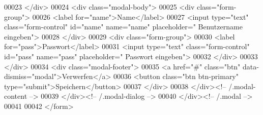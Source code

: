 \begin{DoxyCode}
00023                 </div>
00024                 <div \textcolor{keyword}{class}=\textcolor{stringliteral}{"modal-body"}>
00025                   <div \textcolor{keyword}{class}=\textcolor{stringliteral}{"form-group"}>
00026                             <label \textcolor{keywordflow}{for}=\textcolor{stringliteral}{"name"}>Name</label>
00027                             <input type=\textcolor{stringliteral}{"text"} \textcolor{keyword}{class}=\textcolor{stringliteral}{"form-control"} \textcolor{keywordtype}{id}=\textcolor{stringliteral}{"name"} name=\textcolor{stringliteral}{"name"} placeholder=\textcolor{stringliteral}{"
      Benutzername eingeben"}>
00028                           </div>
00029                           <div \textcolor{keyword}{class}=\textcolor{stringliteral}{"form-group"}>
00030                             <label \textcolor{keywordflow}{for}=\textcolor{stringliteral}{"pass"}>Passwort</label>
00031                             <input type=\textcolor{stringliteral}{"text"} \textcolor{keyword}{class}=\textcolor{stringliteral}{"form-control"} \textcolor{keywordtype}{id}=\textcolor{stringliteral}{"pass"} name=\textcolor{stringliteral}{"pass"} placeholder=\textcolor{stringliteral}{"
      Passwort eingeben"}>
00032                           </div>
00033                 </div>
00034                 <div \textcolor{keyword}{class}=\textcolor{stringliteral}{"modal-footer"}>
00035                   <a href=\textcolor{stringliteral}{"#"} \textcolor{keyword}{class}=\textcolor{stringliteral}{"btn"} data-dismiss=\textcolor{stringliteral}{"modal"}>Verwerfen</a>
00036                   <button \textcolor{keyword}{class}=\textcolor{stringliteral}{"btn btn-primary"} type=\textcolor{stringliteral}{"submit"}>Speichern</button>
00037                 </div>
00038               </div><!-- /.modal-content -->
00039             </div><!-- /.modal-dialog -->
00040           </div><!-- /.modal -->
00041           
00042           </form>
\end{DoxyCode}
